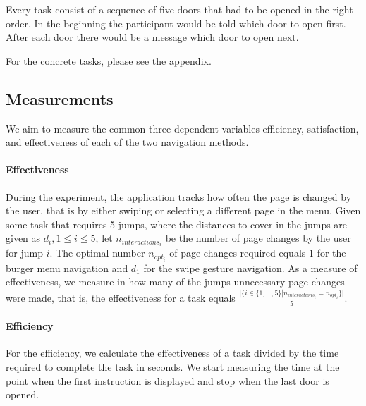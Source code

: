\documentclass{sig-alternate-05-2015}
\begin{document}
Every task consist of a sequence of five doors that had to be opened in the right order. In the beginning the participant would be told which door to open first. After each door there would be a message which door to open next.

For the concrete tasks, please see the appendix. 

\subsection{Measurements}\label{chap:measurements}
\label{sec:measurements}
We aim to measure the common three dependent variables efficiency, satisfaction, and effectiveness of each of the two navigation methods.
\paragraph{Effectiveness}
During the experiment, the application tracks how often the page is changed by the user, that is by either swiping or selecting a different page in the menu. 
Given some task that requires 5 jumps, where the distances to cover in the jumps are given as $d_i, 1 \leq i \leq 5$, let $n_{interactions_i}$ be the number
of page changes by the user for jump $i$.
The optimal number $n_{opt_i}$ of
page changes required equals $1$ for the burger menu navigation and $d_1$ for the swipe gesture navigation. As a measure of 
effectiveness, we measure in how many of the jumps unnecessary page changes were made, that is, the effectiveness for a task
equals $\frac{|\{i \in \{1,\ldots,5\} | n_{interactions_i} = n_{opt_i} \}|}{5}$.
\paragraph{Efficiency} For the efficiency, we calculate the effectiveness of a task divided by the time 
required to complete the task in seconds. We start measuring the time at the point
when the first instruction is displayed and stop when the last door is opened.
\end{document}
